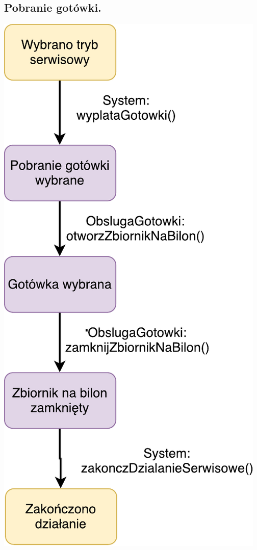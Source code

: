 \documentclass[11pt]{article}
\begin{document}
		\subsection{Pobranie gotówki.}
		\begin{center}
			\includegraphics[scale=1.0]{stanu7.pdf}
		\end{center}
		\newpage
\end{document}
